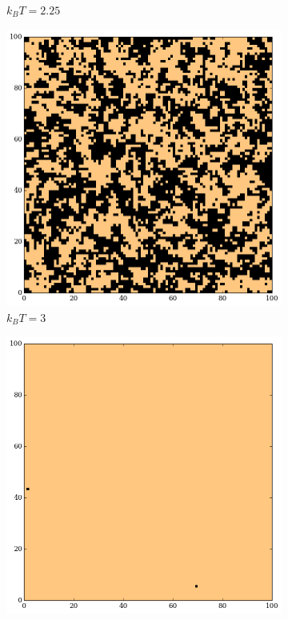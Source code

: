 \documentclass{scrartcl}
\begin{document}
\begin{figure}[H]
\begin{subfigure}{.32\textwidth}
        \caption{$k_BT = 2.25$}
    \end{subfigure}%
    \begin{subfigure}{.32\textwidth}
        \includegraphics[width=\textwidth]{plots/sc_u_3.png}
        \caption{$k_BT = 3$}
    \end{subfigure}
    \begin{subfigure}{.32\textwidth}
        \includegraphics[width=\textwidth]{plots/sc_r_1.png}

\end{subfigure}
\end{figure}
\end{document}
